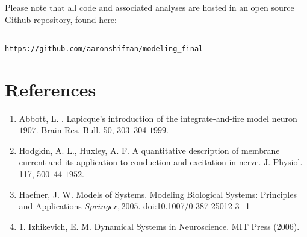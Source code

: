 \documentclass[11pt]{report}
\begin{document}
Please note that all code and associated analyses are hosted in an open source Github repository, found here:

\begin{lstlisting}

https://github.com/aaronshifman/modeling_final
\end{lstlisting}

\chapter{References} %
\label{sec:references}

\begin{enumerate}
  \item Abbott, L. . Lapicque’s introduction of the integrate-and-fire model neuron \(1907\). Brain Res. Bull. 50, 303–304 \(1999\).
  \item Hodgkin, A. L., Huxley, A. F. A quantitative description of membrane current and its application to conduction and excitation in nerve. J. Physiol. 117, 500–44 \(1952\).
  \item Haefner, J. W. Models of Systems. Modeling Biological Systems: Principles and Applications \(Springer, 2005\). doi:10.1007/0-387-25012-3\_1
  \item 1. Izhikevich, E. M. Dynamical Systems in Neuroscience. MIT Press (2006).
\end{enumerate}


\end{document}
